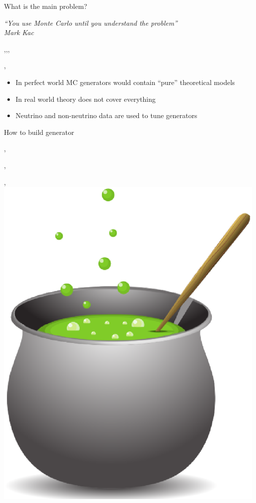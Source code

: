 
\begin{slide}[toc=The main problem]{What is the main problem?}
\null\vfill

  {\it\color{pdcolor3}\hfill ``You use Monte Carlo until you understand the problem''}\\
  {\it\color{pdcolor3}\hfill Mark Kac}

  \sep\sep\sep
  
  \twocolumn
  {
    \sep
  
    \begin{itemize}
      \item In perfect world MC generators would contain ``pure'' theoretical models
      \item In real world theory does not cover everything
      \item Neutrino and non-neutrino data are used to tune generators
    \end{itemize}
  }
  {
    \centering
  }
  
\vfill\null
\end{slide}

\begin{wideslide}[toc=Cooking generator]{How to build generator}
\null\vfill

  \sep

  \twocolumn
  {
     \sep
    
    \centering\scalebox{0.75}{}
  }
  {
     \sep
    \centering\includegraphics[width = \columnwidth]{img/kociol.eps}
  }
  
\vfill\null
\end{wideslide}

